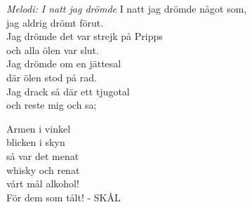 {\footnotesize\textit{Melodi: I natt jag drömde}}
\vspace{10pt}
I natt jag drömde något som,\\
jag aldrig drömt förut.\\
Jag drömde det var strejk på Pripps\\
och alla ölen var slut.\\
Jag drömde om en jättesal\\
där ölen stod på rad.\\
Jag drack så där ett tjugotal\\
och reste mig och sa;\par
\vspace{10pt}
Armen i vinkel\\
blicken i skyn\\
så var det menat\\
whisky och renat\\
vårt mål alkohol!\\
För dem som tålt! - SKÅL
